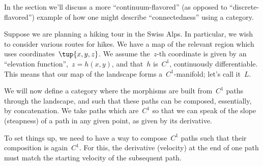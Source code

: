 

In the section we'll discuss a more ``continuum-flavored'' (as opposed to ``discrete-flavored'') example of how one might describe ``connectedness'' using a category.


Suppose we are planning a hiking tour in the Swiss Alps. In particular, we wish to consider various routes for hikes. We have a map of the relevant region which uses coordinates~$\tup{x,y,z}$. We assume the~$z$-th coordinate is given by an ``elevation function'',~$z = h(x,y)$, and that~$h$ is~$C^1$,  continuously differentiable. This means that our map of the landscape forms a~$C^1$-manifold; let's call it~$L$.


We will now define a category where the morphisms are built from~$C^1$ paths through the landscape, and such that these paths can be composed, essentially, by concatenation. We take paths which are~$C^1$ so that we can speak of the slope (steapness) of a path in any given point, as given by its derivative.

%
%


To set things up, we need to have a way to compose~$C^1$ paths such that their composition is again~$C^1$. For this, the derivative (velocity) at the end of one path must match the starting velocity of the subsequent path.

